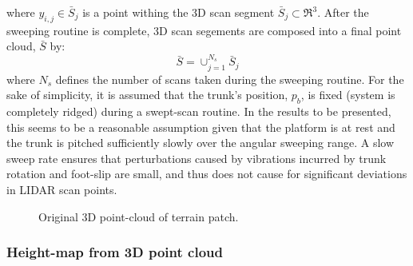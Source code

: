 				where $y_{i,j} \in \bar{S}_{j}$ is a point withing the 3D \Jth scan segment $\bar{S}_{j} \subset \Re^{3}$. After the sweeping routine is complete, 3D scan segements are composed into a final point cloud, $\bar{S}$ by:
				\begin{equation}
					\bar{S} = \cup_{j=1}^{N_{s}} \bar{S}_{j}
				\end{equation}
				where $N_{s}$ defines the number of scans taken during the sweeping routine.
				For the sake of simplicity, it is assumed that the trunk's position, $p_{b}$, is fixed (system is completely ridged) during a swept-scan routine. In the results to be presented, this seems to be a reasonable assumption given that the platform is at rest and the trunk is pitched sufficiently slowly over the angular sweeping range. A slow sweep rate ensures that perturbations caused by vibrations incurred by trunk rotation and foot-slip are small, and thus does not cause for significant deviations in LIDAR scan points.
					\begin{figure}[h!]
						\centering
						\caption{Original 3D point-cloud of terrain patch.}
						\label{fig::pointcloud_terrain_patch}
					\end{figure}


			\subsubsection{Height-map from 3D point cloud}
				
